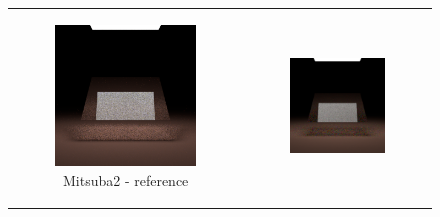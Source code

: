 \renewcommand\thesubfigure{\arabic{subfigure}}
\begin{figure}[h]
	\centering
	\begin{tabular}{cc}
		\begin{subfigure}
			{0.4\textwidth}\centering\includegraphics[width=\linewidth]{img/polarizing_plane_90.png}
			\caption{Mitsuba2 - reference}
		\end{subfigure}
		&
		\begin{subfigure}
			{0.4\textwidth}\centering\includegraphics[width=\linewidth]{img/polarizing_plane_90_ART.png}

\end{subfigure}
\end{tabular}
\end{figure}
